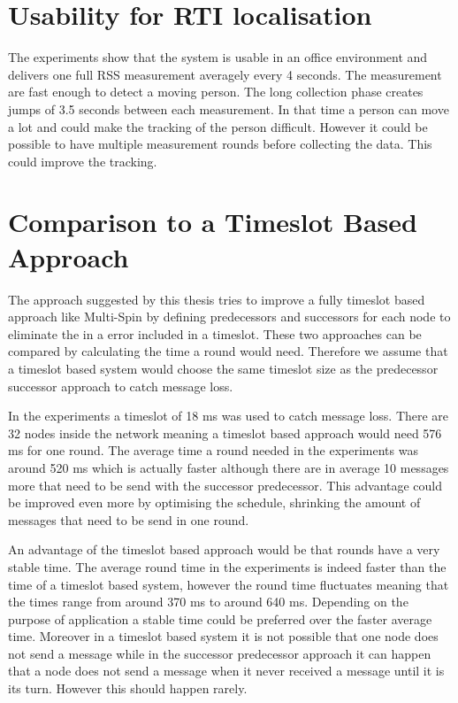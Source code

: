 \section{Usability for RTI localisation}
The experiments show that the system is usable in an office environment and delivers one full RSS measurement averagely every 4 seconds. The measurement are fast enough to detect a moving person. The long collection phase creates jumps of 3.5 seconds between each measurement. In that time a person can move a lot and could make the tracking of the person difficult. However it could be possible to have multiple measurement rounds before collecting the data. This could improve the tracking.

\section{Comparison to a Timeslot Based Approach}
The approach suggested by this thesis tries to improve a fully timeslot based approach like Multi-Spin by defining predecessors and successors for each node to eliminate the in a error included in a timeslot. 
These two approaches can be compared by calculating the time a round would need. Therefore we assume that a timeslot based system would choose the same timeslot size as the predecessor successor approach to catch message loss.

In the experiments a timeslot of 18 ms was used to catch message loss. There are 32 nodes inside the network meaning a timeslot based approach would need 576 ms for one round. The average time a round needed in the experiments was around 520 ms which is actually faster although there are in average 10 messages more that need to be send with the successor predecessor. This advantage could be improved even more by optimising the schedule, shrinking the amount of messages that need to be send in one round.  

An advantage of the timeslot based approach would be that rounds have a very stable time. The average round time in the experiments is indeed faster than the time of a timeslot based system, however the round time fluctuates meaning that the times range from around 370 ms to around 640 ms. Depending on the purpose of application a stable time could be preferred over the faster average time. Moreover in a timeslot based system it is not possible that one node does not send a message while in the successor predecessor approach it can happen that a node does not send a message when it never received a message until it is its turn. However this should happen rarely.